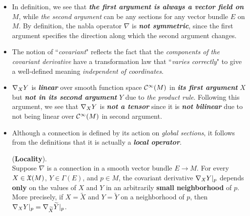 \documentclass[11pt]{article}
\begin{document}
\begin{itemize}
\item \begin{remark}
In definition, we see that \emph{\textbf{the first argument is always a vector field on $M$}}, while \emph{the second argument} can be any sections for any vector bundle $E$ on $M$. By definition, the nabla operator $\nabla$ is \emph{\textbf{not symmetric}}, since the first argument specifies the direction along which the second argument changes.
\end{remark}

\item \begin{remark}
The notion of ``\textit{covariant}" reflects the fact that the \emph{components of the covariant derivative} have a transformation law that ``\emph{varies correctly}" to give a well-defined meaning \emph{independent of coordinates}. 
\end{remark}

\item \begin{remark}
$\nabla_{X}{Y}$ is \emph{\textbf{linear}} over smooth function space ${\mathcal C}^{\infty}(M)$ in \emph{\textbf{its first argument}} $X$ but \emph{\textbf{not in its second argument}} $Y$ due to \emph{the product rule}. Following this argument, we see that $\nabla_{X}{Y}$ is \emph{\textbf{not a tensor}} since it is \emph{\textbf{not bilinear}} due to not being linear over ${\mathcal C}^{\infty}(M)$ in second argument.
\end{remark}

\item \begin{remark}
Although a connection is defined by its action on \emph{global sections}, it follows from the definitions that it is actually a \emph{\textbf{local operator}}.
\end{remark}
\begin{lemma} \label{lem: locality} (\textbf{Locality}). \citep{lee2018introduction}\\
Suppose $\nabla$ is a connection in a smooth vector bundle $E \rightarrow M$. For every $X \in {\mathfrak X}(M)$, $Y\in \Gamma(E)$, and $p \in M$, the covariant derivative $\nabla_{X}{Y}|_{p}$ depends \textbf{only} on the values of $X$ and $Y$ in an arbitrarily \textbf{small neighborhood} of $p$. More precisely, if $X = \widetilde{X}$ and $Y = \widetilde{Y}$ on a neighborhood of $p$, then $\nabla_{X}{Y}|_{p} = \nabla_{\widetilde{X}}{\widetilde{Y}}|_{p}$.
\end{lemma}


\end{itemize}
\end{document}
